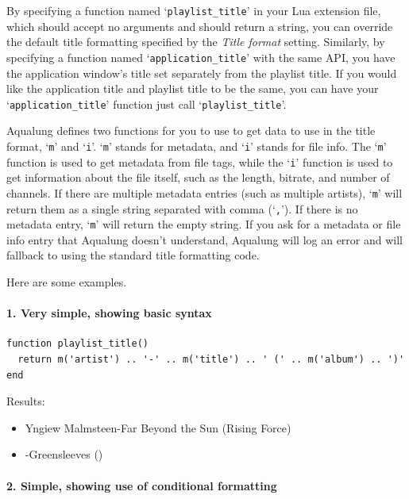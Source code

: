 \documentclass[10pt,english]{article}
\begin{document}
\noindent By specifying a function named `\texttt{playlist\_title}'
in your Lua extension file, which should accept no arguments and
should return a string, you can override the default title formatting
specified by the \textsl{Title format} setting. Similarly,
by specifying a function named `\texttt{application\_title}' with
the same API, you have the application window's title set separately
from the playlist title.  If you would like
the application title and playlist title to be the same, you
can have your `\texttt{application\_title}' function
just call `\texttt{playlist\_title}'.




Aqualung defines two functions for you to use to get data
to use in the title format, `\texttt{m}' and
`\texttt{i}'. `\texttt{m}' stands for metadata,
and `\texttt{i}' stands for file info. The
`\texttt{m}' function is used to get metadata from file
tags, while the `\texttt{i}' function is used to get
information about the file itself, such as the length,
bitrate, and number of channels. If there are multiple
metadata entries (such as multiple artists),
`\texttt{m}' will return them as a single string
separated with comma (`\texttt{,}'). If there is no
metadata entry, `\texttt{m}' will return the empty
string. If you ask for a metadata or file info entry that
Aqualung doesn't understand, Aqualung will log an error and
will fallback to using the standard title formatting code.




Here are some examples.


\paragraph*{1. Very simple, showing basic syntax}

\begin{verbatim}
function playlist_title()
  return m('artist') .. '-' .. m('title') .. ' (' .. m('album') .. ')'
end
\end{verbatim}



\noindent Results:


\begin{itemize}
\item Yngiew Malmsteen-Far Beyond the Sun (Rising Force)
\item -Greensleeves ()
\end{itemize}



\paragraph*{2. Simple, showing use of conditional formatting}
\end{document}
